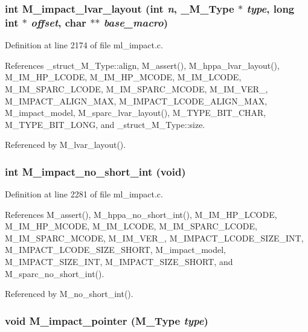 \subsubsection{\setlength{\rightskip}{0pt plus 5cm}int M\_\-impact\_\-lvar\_\-layout (int {\em n}, \bf{\_\-M\_\-Type} $\ast$ {\em type}, long int $\ast$ {\em offset}, char $\ast$$\ast$ {\em base\_\-macro})}\label{m__impact_8h_4bd8555cf87df1b9454f2434769496bc}




Definition at line 2174 of file ml\_\-impact.c.

References \_\-struct\_\-M\_\-Type::align, M\_\-assert(), M\_\-hppa\_\-lvar\_\-layout(), M\_\-IM\_\-HP\_\-LCODE, M\_\-IM\_\-HP\_\-MCODE, M\_\-IM\_\-LCODE, M\_\-IM\_\-SPARC\_\-LCODE, M\_\-IM\_\-SPARC\_\-MCODE, M\_\-IM\_\-VER\_, M\_\-IMPACT\_\-ALIGN\_\-MAX, M\_\-IMPACT\_\-LCODE\_\-ALIGN\_\-MAX, M\_\-impact\_\-model, M\_\-sparc\_\-lvar\_\-layout(), M\_\-TYPE\_\-BIT\_\-CHAR, M\_\-TYPE\_\-BIT\_\-LONG, and \_\-struct\_\-M\_\-Type::size.

Referenced by M\_\-lvar\_\-layout().
\subsubsection{\setlength{\rightskip}{0pt plus 5cm}int M\_\-impact\_\-no\_\-short\_\-int (void)}\label{m__impact_8h_44be82987adbaf2e3dbabec49ffb4ffe}




Definition at line 2281 of file ml\_\-impact.c.

References M\_\-assert(), M\_\-hppa\_\-no\_\-short\_\-int(), M\_\-IM\_\-HP\_\-LCODE, M\_\-IM\_\-HP\_\-MCODE, M\_\-IM\_\-LCODE, M\_\-IM\_\-SPARC\_\-LCODE, M\_\-IM\_\-SPARC\_\-MCODE, M\_\-IM\_\-VER\_, M\_\-IMPACT\_\-LCODE\_\-SIZE\_\-INT, M\_\-IMPACT\_\-LCODE\_\-SIZE\_\-SHORT, M\_\-impact\_\-model, M\_\-IMPACT\_\-SIZE\_\-INT, M\_\-IMPACT\_\-SIZE\_\-SHORT, and M\_\-sparc\_\-no\_\-short\_\-int().

Referenced by M\_\-no\_\-short\_\-int().
\subsubsection{\setlength{\rightskip}{0pt plus 5cm}void M\_\-impact\_\-pointer (\bf{M\_\-Type} {\em type})}\label{m__impact_8h_31e92222e58968dbe9347df025cab8a9}




